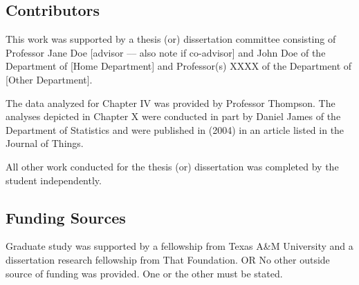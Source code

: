 \subsection*{Contributors}
This work was supported by a thesis (or) dissertation committee consisting of Professor Jane Doe [advisor --– also note if co-advisor] and John Doe of the Department of [Home Department] and Professor(s) XXXX of the Department of [Other Department].

The data analyzed for Chapter IV was provided by Professor Thompson. The analyses depicted in Chapter X were conducted in part by Daniel James of the Department of Statistics and were published in (2004) in an article listed in the Journal of Things.

All other work conducted for the thesis (or) dissertation was completed by the student independently.
\subsection*{Funding Sources}
Graduate study was supported by a fellowship from Texas A\&M University and a dissertation research fellowship from That Foundation. OR No other outside source of funding was provided. One or the other must be stated.
\pagebreak{}